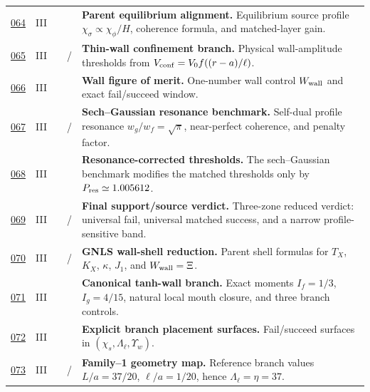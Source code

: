 {\begin{longtable}{@{}L{0.055\textwidth}L{0.075\textwidth}L{0.145\textwidth}L{0.235\textwidth}L{0.43\textwidth}@{}}
\addlinespace
\hyperref[stage:064]{064} & III &  & \StatusExactClosure{} & \textbf{Parent equilibrium alignment.} Equilibrium source profile \(\chi_\sigma\propto \chi_\phi/H\), coherence formula, and matched-layer gain. \\
\addlinespace
\hyperref[stage:065]{065} & III &  & \StatusExactClosure{} / \StatusReduced{} & \textbf{Thin-wall confinement branch.} Physical wall-amplitude thresholds from \(V_{\rm conf}=V_0 f((r-a)/\ell)\). \\
\addlinespace
\hyperref[stage:066]{066} & III &  & \StatusExactClosure{} & \textbf{Wall figure of merit.} One-number wall control \(W_{\rm wall}\) and exact fail/succeed window. \\
\addlinespace
\hyperref[stage:067]{067} & III &  & \StatusExactClosure{} / \StatusNumerical{} & \textbf{Sech--Gaussian resonance benchmark.} Self-dual profile resonance \(w_g/w_f=\sqrt\pi\), near-perfect coherence, and penalty factor. \\
\addlinespace
\hyperref[stage:068]{068} & III &  & \StatusExactClosure{} & \textbf{Resonance-corrected thresholds.} The sech--Gaussian benchmark modifies the matched thresholds only by \(P_{\rm res}\simeq1.005612\). \\
\addlinespace
\hyperref[stage:069]{069} & III &  & \StatusExactClosure{} / \StatusOpen{} & \textbf{Final support/source verdict.} Three-zone reduced verdict: universal fail, universal matched success, and a narrow profile-sensitive band. \\
\addlinespace
\hyperref[stage:070]{070} & III &  & \StatusExactClosure{} / \StatusReduced{} & \textbf{GNLS wall-shell reduction.} Parent shell formulas for \(T_X\), \(K_X\), \(\kappa\), \(J_1\), and \(W_{\rm wall}=\Xi\). \\
\addlinespace
\hyperref[stage:071]{071} & III &  & \StatusExactClosure{} & \textbf{Canonical tanh-wall branch.} Exact moments \(I_f=1/3\), \(I_g=4/15\), natural local mouth closure, and three branch controls. \\
\addlinespace
\hyperref[stage:072]{072} & III &  & \StatusExactClosure{} & \textbf{Explicit branch placement surfaces.} Fail/succeed surfaces in \((\chi_s,\Lambda_\ell,\Upsilon_w)\). \\
\addlinespace
\hyperref[stage:073]{073} & III &  & \StatusReduced{} / \StatusExactClosure{} & \textbf{Family--1 geometry map.} Reference branch values \(L/a=37/20\), \(\ell/a=1/20\), hence \(\Lambda_\ell=\eta=37\). \\

\end{longtable}}
